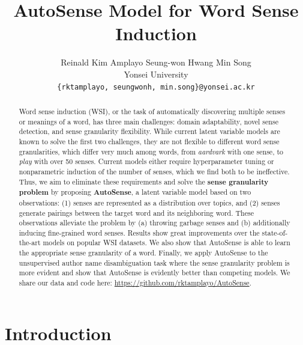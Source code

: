 \documentclass[letterpaper]{article} %
\begin{document}
%
\title{AutoSense Model for Word Sense Induction}

\author{
    Reinald Kim Amplayo \quad Seung-won Hwang \quad Min Song\\
    Yonsei University \\
    {\tt \{rktamplayo, seungwonh, min.song\}@yonsei.ac.kr}
}

\maketitle
\begin{abstract}
 Word sense induction (WSI), or the task of automatically discovering multiple senses or meanings of a word, has three main challenges: domain adaptability, novel sense detection, and sense granularity flexibility. While current latent variable models are known to solve the first two challenges, they are not flexible to different word sense granularities, which differ very much among words, from \textit{aardvark} with one sense, to \textit{play} with over 50 senses. Current models either require hyperparameter tuning or nonparametric induction of the number of senses, which we find both to be ineffective. Thus, we aim to eliminate these requirements and solve the \textbf{sense granularity problem} by proposing \textbf{AutoSense}, a latent variable model based on two observations: (1) senses are represented as a distribution over topics, and (2) senses generate pairings between the target word and its neighboring word. These observations alleviate the problem by (a) throwing garbage senses and (b) additionally inducing fine-grained word senses. Results show great improvements over the state-of-the-art models on popular WSI datasets. We also show that AutoSense is able to learn the appropriate sense granularity of a word. Finally, we apply AutoSense to the unsupervised author name disambiguation task where the sense granularity problem is more evident and show that AutoSense is evidently better than competing models. We share our data and code here: \url{https://github.com/rktamplayo/AutoSense}.
\end{abstract}

\setlength{\abovedisplayskip}{0pt}%
\setlength{\belowdisplayskip}{0pt}%
\setlength{\abovedisplayshortskip}{0pt}%
\setlength{\belowdisplayshortskip}{0pt}%
\setlength{\jot}{0pt}

\section{Introduction}
\end{document}

